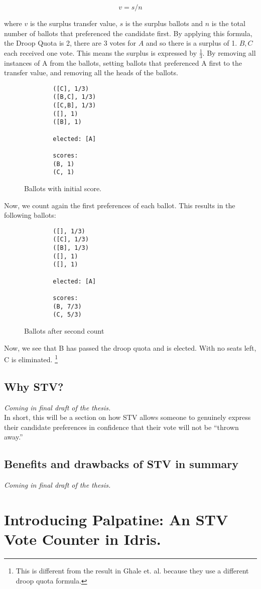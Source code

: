 $$
v = s/n
$$

where $v$ is the surplus transfer value, $s$ is the surplus ballots and $n$ is
the total number of ballots that preferenced the candidate first. By applying
this formula, the Droop Quota is 2, there are 3 votes for $A$ and so there is a
surplus of 1. $B, C$ each received one vote. This means the surplus is expressed
by $\frac{1}{3}$. By removing all instances of A from the ballots, setting
ballots that preferenced A first to the transfer value, and removing all the
heads of the ballots.

\begin{figure}[ht!!!!!!!!]
    \caption{Ballots with initial score.}
    \label{sample_election2}
    \begin{lstlisting}
        ([C], 1/3)
        ([B,C], 1/3)
        ([C,B], 1/3)
        ([], 1)
        ([B], 1)
        
        elected: [A]
        
        scores: 
        (B, 1)
        (C, 1)
    \end{lstlisting}
\end{figure}

Now, we count again the first preferences of each ballot. This results in the
following ballots: 

\begin{figure}[ht!!!!!!!!]
    \caption{Ballots after second count}
    \label{sample_election2}
    \begin{lstlisting}
        ([], 1/3)
        ([C], 1/3)
        ([B], 1/3)
        ([], 1)
        ([], 1)
        
        elected: [A]
        
        scores: 
        (B, 7/3)
        (C, 5/3)
    \end{lstlisting}
\end{figure}

Now, we see that B has passed the droop quota and is elected. With no seats
left, C is eliminated. \footnote{This is different from the result in Ghale et.
al. because they use a different droop quota formula.}

\section{Why STV?}
\textit{Coming in final draft of the thesis.} \\
In short, this will be a section on how STV allows someone to genuinely express
their candidate preferences in confidence that their vote will not be ``thrown
away.''

\section{Benefits and drawbacks of STV in summary}
\textit{Coming in final draft of the thesis.}



\chapter{Introducing Palpatine: An STV Vote Counter in Idris.}


